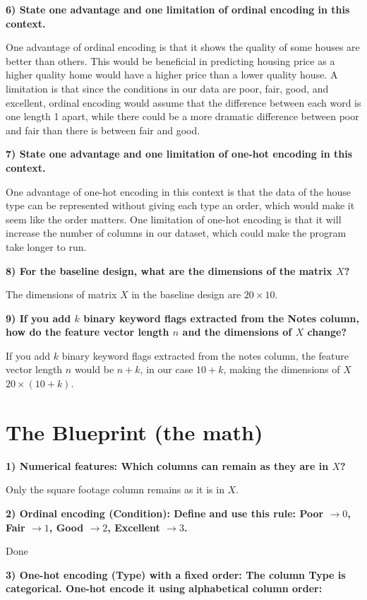 \documentclass[11pt]{article}
\begin{document}
\textbf{6) State one advantage and one limitation of ordinal encoding in this context.}

One advantage of ordinal encoding is that it shows the quality of some houses are better than others. This would be beneficial in predicting housing price as a higher quality home would have a higher price than a lower quality house. A limitation is that since the conditions in our data are poor, fair, good, and excellent, ordinal encoding would assume that the difference between each word is one length 1 apart, while there could be a more dramatic difference between poor and fair than there is between fair and good.

\textbf{7) State one advantage and one limitation of one-hot encoding in this context.}

One advantage of one-hot encoding in this context is that the data of the house type can be represented without giving each type an order, which would make it seem like the order matters. One limitation of one-hot encoding is that it will increase the number of columns in our dataset, which could make the program take longer to run.

\textbf{8) For the baseline design, what are the dimensions of the matrix $X$?}

The dimensions of matrix $X$ in the baseline design are $20 \times 10$.

\textbf{9) If you add $k$ binary keyword flags extracted from the Notes column, how do the feature vector length $n$ and the dimensions of $X$ change?}

If you add $k$ binary keyword flags extracted from the notes column, the feature vector length $n$ would be $n+k$, in our case $10+k$, making the dimensions of $X$ $20 \times (10+k)$.

\section{The Blueprint (the math)}

\textbf{1) Numerical features: Which columns can remain as they are in $X$?}

Only the square footage column remains as it is in $X$.

\textbf{2) Ordinal encoding (Condition): Define and use this rule: Poor $\to 0$, Fair $\to 1$, Good $\to 2$, Excellent $\to 3$.}

Done \checkmark

\textbf{3) One-hot encoding (Type) with a fixed order: The column Type is categorical. One-hot encode it using alphabetical column order:}
\end{document}
